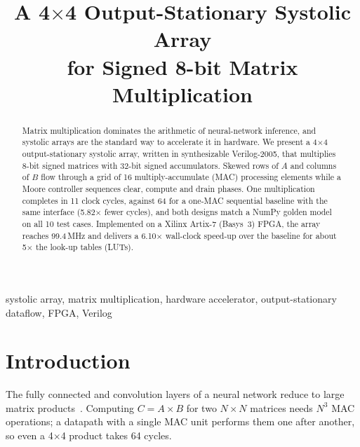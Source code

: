 \documentclass[conference]{IEEEtran}
\begin{document}
\title{A 4$\times$4 Output-Stationary Systolic Array\\ for Signed 8-bit Matrix Multiplication}

\author{
}

\maketitle

\begin{abstract}
Matrix multiplication dominates the arithmetic of neural-network inference, and
systolic arrays are the standard way to accelerate it in hardware. We present a
4$\times$4 output-stationary systolic array, written in synthesizable
Verilog-2005, that multiplies 8-bit signed matrices with 32-bit signed
accumulators. Skewed rows of $A$ and columns of $B$ flow through a grid of 16
multiply-accumulate (MAC) processing elements while a Moore controller
sequences clear, compute and drain phases. One multiplication completes in
11 clock cycles, against 64 for a one-MAC sequential baseline with the same
interface (5.82$\times$ fewer cycles), and both designs match a NumPy golden
model on all 10 test cases. Implemented on a Xilinx Artix-7 (Basys~3) FPGA, the
array reaches 99.4\,MHz and delivers a 6.10$\times$ wall-clock speed-up over the
baseline for about 5$\times$ the look-up tables (LUTs).
\end{abstract}

\begin{IEEEkeywords}
systolic array, matrix multiplication, hardware accelerator, output-stationary
dataflow, FPGA, Verilog
\end{IEEEkeywords}

\section{Introduction}
The fully connected and convolution layers of a neural network reduce to large
matrix products~\cite{sze2017}. Computing $C = A \times B$ for two $N \times N$
matrices needs $N^3$ MAC operations; a datapath with a single MAC unit performs
them one after another, so even a 4$\times$4 product takes 64 cycles.
\end{document}
